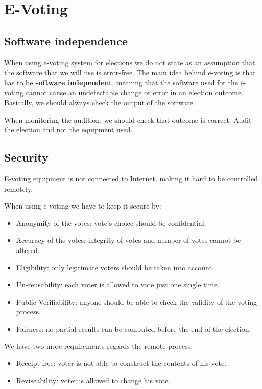 \section{E-Voting}

\subsection{Software independence}
When using e-voting system for elections we do not state as an assumption that the software that we will use is error-free.
The main idea behind e-voting is that has to be \textbf{software independent}, meaning that the software used for the e-voting cannot cause an undetectable change or error in an election outcome. Basically, we should always check the output of the software. 

When monitoring the audition, we should check that outcome is correct. Audit the election and not the equipment used. 

\subsection{Security}

E-voting equipment is not connected to Internet, making it hard to be controlled remotely. 

When using e-voting we have to keep it secure by: 

\begin{itemize}
    \item Anonymity of the votes: vote's choice should be confidential.
    \item Accuracy of the votes: integrity of votes and number of votes cannot be altered. 
    \item Eligibility: only legitimate voters should be taken into account. 
    \item Un-reusability: each voter is allowed to vote just one single time. 
    \item Public Verifiability: anyone should be able to check the validity of the voting process.
    \item Fairness: no partial results can be computed before the end of the election. 
\end{itemize}

We have two more requirements regards the remote process:

\begin{itemize}
    \item Receipt-free: voter is not able to construct the contents of his vote.
    \item Reviseability: voter is allowed to change his vote. 
\end{itemize}

